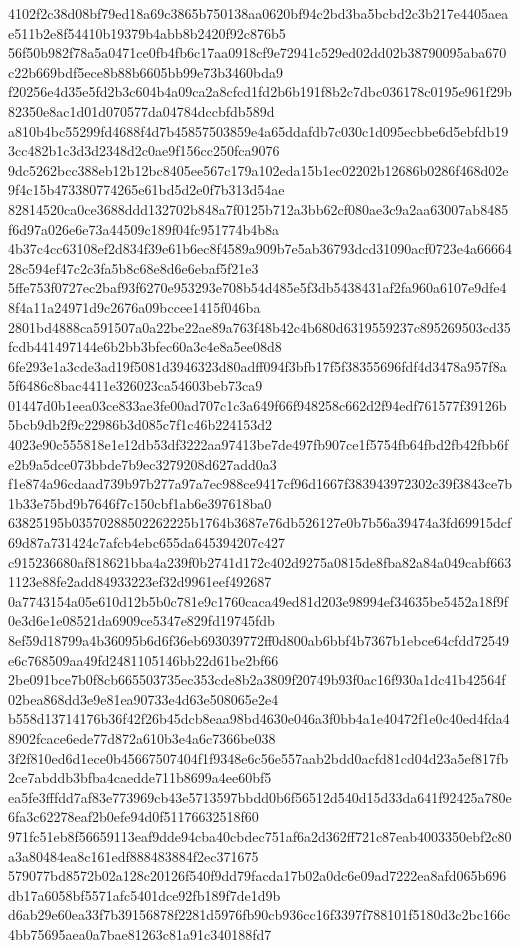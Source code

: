 \documentclass[11pt,a4paper]{article}
\begin{document}
{4102f2c38d08bf79ed18a69c3865b750138aa0620bf94c2bd3ba5bcbd2c3b217e4405aeae511b2e8f54410b19379b4abb8b2420f92c876b5
56f50b982f78a5a0471ce0fb4fb6c17aa0918cf9e72941c529ed02dd02b38790095aba670c22b669bdf5ece8b88b6605bb99e73b3460bda9
f20256e4d35e5fd2b3c604b4a09ca2a8cfcd1fd2b6b191f8b2c7dbc036178c0195e961f29b82350e8ac1d01d070577da04784dccbfdb589d
a810b4bc55299fd4688f4d7b45857503859e4a65ddafdb7c030c1d095ecbbe6d5ebfdb193cc482b1c3d3d2348d2c0ae9f156cc250fca9076
9dc5262bcc388eb12b12bc8405ee567c179a102eda15b1ec02202b12686b0286f468d02e9f4c15b473380774265e61bd5d2e0f7b313d54ae
82814520ca0ce3688ddd132702b848a7f0125b712a3bb62cf080ae3c9a2aa63007ab8485f6d97a026e6e73a44509c189f04fc951774b4b8a
4b37c4cc63108ef2d834f39e61b6ec8f4589a909b7e5ab36793dcd31090acf0723e4a6666428c594ef47c2c3fa5b8c68e8d6e6ebaf5f21e3
5ffe753f0727ec2baf93f6270e953293e708b54d485e5f3db5438431af2fa960a6107e9dfe48f4a11a24971d9c2676a09bccee1415f046ba
2801bd4888ca591507a0a22be22ae89a763f48b42c4b680d6319559237c895269503cd35fcdb441497144e6b2bb3bfec60a3c4e8a5ee08d8
6fe293e1a3cde3ad19f5081d3946323d80adff094f3bfb17f5f38355696fdf4d3478a957f8a5f6486c8bac4411e326023ca54603beb73ca9
01447d0b1eea03ce833ae3fe00ad707c1c3a649f66f948258c662d2f94edf761577f39126b5bcb9db2f9c22986b3d085c7f1c46b224153d2
4023e90c555818e1e12db53df3222aa97413be7de497fb907ce1f5754fb64fbd2fb42fbb6fe2b9a5dce073bbde7b9ec3279208d627add0a3
f1e874a96cdaad739b97b277a97a7ec988ce9417cf96d1667f383943972302c39f3843ce7b1b33e75bd9b7646f7c150cbf1ab6e397618ba0
63825195b03570288502262225b1764b3687e76db526127e0b7b56a39474a3fd69915dcf69d87a731424c7afcb4ebc655da645394207c427
c915236680af818621bba4a239f0b2741d172c402d9275a0815de8fba82a84a049cabf6631123e88fe2add84933223ef32d9961eef492687
0a7743154a05e610d12b5b0c781e9c1760caca49ed81d203e98994ef34635be5452a18f9f0e3d6e1e08521da6909ce5347e829fd19745fdb
8ef59d18799a4b36095b6d6f36eb693039772ff0d800ab6bbf4b7367b1ebce64cfdd72549e6c768509aa49fd2481105146bb22d61be2bf66
2be091bce7b0f8cb665503735ec353cde8b2a3809f20749b93f0ac16f930a1dc41b42564f02bea868dd3e9e81ea90733e4d63e508065e2e4
b558d13714176b36f42f26b45dcb8eaa98bd4630e046a3f0bb4a1e40472f1e0c40ed4fda48902fcace6ede77d872a610b3e4a6c7366be038
3f2f810ed6d1ece0b45667507404f1f9348e6c56e557aab2bdd0acfd81cd04d23a5ef817fb2ce7abddb3bfba4caedde711b8699a4ee60bf5
ea5fe3fffdd7af83e773969cb43e5713597bbdd0b6f56512d540d15d33da641f92425a780e6fa3c62278eaf2b0efe94d0f51176632518f60
971fc51eb8f56659113eaf9dde94cba40cbdec751af6a2d362ff721c87eab4003350ebf2c80a3a80484ea8c161edf888483884f2ec371675
579077bd8572b02a128c20126f540f9dd79facda17b02a0dc6e09ad7222ea8afd065b696db17a6058bf5571afc5401dce92fb189f7de1d9b
d6ab29e60ea33f7b39156878f2281d5976fb90cb936cc16f3397f788101f5180d3c2bc166c4bb75695aea0a7bae81263c81a91c340188fd7
}
\end{document}
